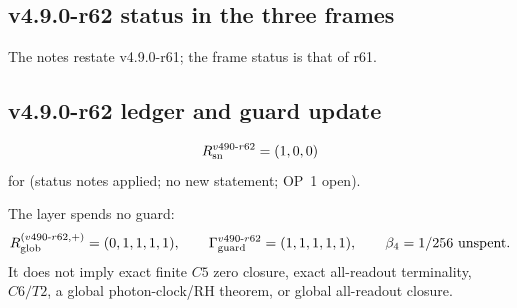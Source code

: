 \subsection*{v4.9.0-r62 status in the three frames}
\label{subsec:v490-r62-frames}

The notes restate v4.9.0-r61; the frame status is that of r61.

\subsection*{v4.9.0-r62 ledger and guard update}
\label{subsec:v490-r62-ledger-guard}

\[
R_{\rm sn}^{v490\text{-}r62}=(1,0,0)
\]
for (status notes applied; no new statement; OP~1 open).

The layer spends no guard:
\[
R_{\rm glob}^{(v490\text{-}r62,+)}=(0,1,1,1,1),
\qquad
\Gamma_{\rm guard}^{v490\text{-}r62}=(1,1,1,1,1),
\qquad
\beta_4=1/256\ \text{unspent}.
\]
It does not imply exact finite \(C5\) zero closure, exact all-readout terminality,
\(C6/T2\), a global photon-clock/RH theorem, or global all-readout closure.
